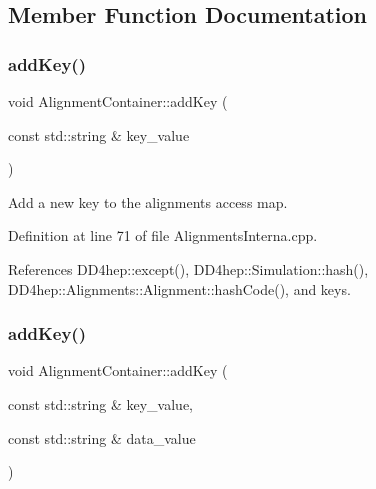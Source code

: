 \subsection{Member Function Documentation}
\hypertarget{class_d_d4hep_1_1_alignments_1_1_interna_1_1_alignment_container_a406e1b76c87e1a1929e9e7f7d27eb5ff}{}\label{class_d_d4hep_1_1_alignments_1_1_interna_1_1_alignment_container_a406e1b76c87e1a1929e9e7f7d27eb5ff} 
\subsubsection{\texorpdfstring{add\+Key()}{addKey()}\hspace{0.1cm}{\footnotesize\ttfamily [1/2]}}
{\footnotesize\ttfamily void Alignment\+Container\+::add\+Key (\begin{DoxyParamCaption}\item[{const std\+::string \&}]{key\+\_\+value }\end{DoxyParamCaption})}



Add a new key to the alignments access map. 



Definition at line 71 of file Alignments\+Interna.\+cpp.



References D\+D4hep\+::except(), D\+D4hep\+::\+Simulation\+::hash(), D\+D4hep\+::\+Alignments\+::\+Alignment\+::hash\+Code(), and keys.

\hypertarget{class_d_d4hep_1_1_alignments_1_1_interna_1_1_alignment_container_acbb65fe1f661172f578599b4e0ef29c5}{}\label{class_d_d4hep_1_1_alignments_1_1_interna_1_1_alignment_container_acbb65fe1f661172f578599b4e0ef29c5} 
\subsubsection{\texorpdfstring{add\+Key()}{addKey()}\hspace{0.1cm}{\footnotesize\ttfamily [2/2]}}
{\footnotesize\ttfamily void Alignment\+Container\+::add\+Key (\begin{DoxyParamCaption}\item[{const std\+::string \&}]{key\+\_\+value,  }\item[{const std\+::string \&}]{data\+\_\+value }\end{DoxyParamCaption})}



